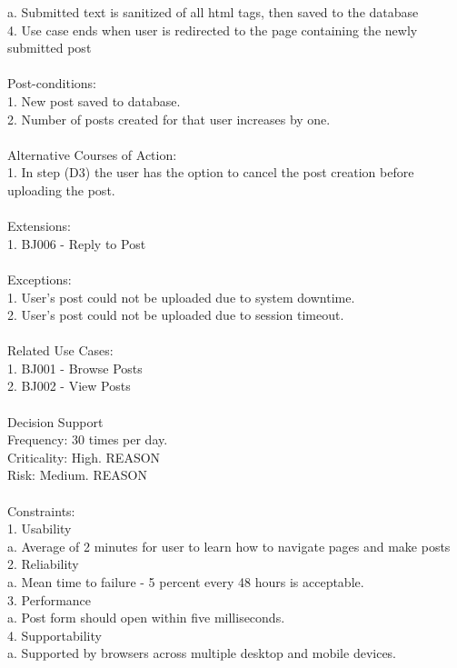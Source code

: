 \documentclass{report}
\begin{document}
	a.	Submitted text is sanitized of all html tags, then saved to the database\\
4.	Use case ends when user is redirected to the page containing the newly submitted post\\
\\
Post-conditions: \\
1.	New post saved to database.\\
2.	Number of posts created for that user increases by one.\\
\\
Alternative Courses of Action:\\
1.	In step (D3) the user has the option to cancel the post creation before uploading the post.\\
\\
Extensions:\\
1.	BJ006 - Reply to Post\\
\\
Exceptions: \\
1.	User’s post could not be uploaded due to system downtime.\\
2.	User’s post could not be uploaded due to session timeout.\\
\\
Related Use Cases: \\
1.	BJ001 - Browse Posts\\
2.	BJ002 - View Posts\\
\\
Decision Support\\
     Frequency: 30 times per day.\\
     Criticality: High. REASON\\
     Risk: Medium. REASON\\
\\
Constraints: \\
1.	Usability\\
	a.	Average of 2 minutes for user to learn how to navigate pages and make posts\\
2.	Reliability\\
	a.	Mean time to failure - 5 percent every 48 hours is acceptable.\\
3.	Performance\\
	a.	Post form should open within five milliseconds.\\
4.	Supportability\\
	a.	Supported by browsers across multiple desktop and mobile devices.\\
\\
\end{document}
